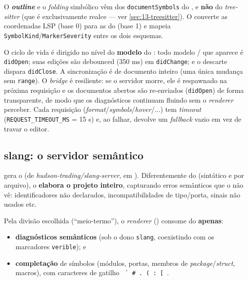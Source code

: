 \begin{nota}
O \textbf{\textit{outline}} e o \textit{folding} simbólico vêm dos
\lstinline|documentSymbols| do , e \textbf{não} do
\textit{tree-sitter} (que é exclusivamente realce — ver
\autoref{sec:13-treesitter}). O  converte as
coordenadas LSP (base 0) para as do  (base 1) e mapeia
\lstinline|SymbolKind|/\lstinline|MarkerSeverity| entre os dois esquemas.
\end{nota}

O ciclo de vida é dirigido no nível do \textbf{modelo} do : todo
modelo / que aparece é \lstinline|didOpen|; suas edições são
debounced (350 ms) em \lstinline|didChange|; e o descarte dispara
\lstinline|didClose|. A sincronização é de documento inteiro (uma única mudança
sem \lstinline|range|). O \textit{bridge} é resiliente: se o servidor morre, ele
é respawnado na próxima requisição e os documentos abertos são re-enviados
(\lstinline|didOpen|) de forma transparente, de modo que os diagnósticos
continuam fluindo sem o \textit{renderer} perceber. Cada requisição
(\textit{format}/\textit{symbols}/\textit{hover}/...) tem \textit{timeout}
(\lstinline|REQUEST_TIMEOUT_MS| = 15 s) e, ao falhar, devolve um \textit{fallback}
vazio em vez de travar o editor.

\subsection{slang: o servidor semântico}

 gera o  (de
\textit{hudson-trading/slang-server}, em
). Diferentemente do 
(sintático e por arquivo), o  \textbf{elabora o projeto inteiro},
capturando erros semânticos que o  não vê: identificadores não
declarados, incompatibilidades de tipo/porta, sinais não usados etc.

Pela divisão escolhida (\enquote{meio-termo}), o \textit{renderer}
() consome do  \textbf{apenas}:

\begin{itemize}[leftmargin=*]
  \item \textbf{diagnósticos semânticos} (sob o dono \lstinline|slang|,
        coexistindo com os marcadores \lstinline|verible|); e
  \item \textbf{completação} de símbolos (módulos, portas, membros de
        \textit{package}/\textit{struct}, macros), com caracteres de gatilho
        \lstinline| ` # . ( : [ |.
\end{itemize}

